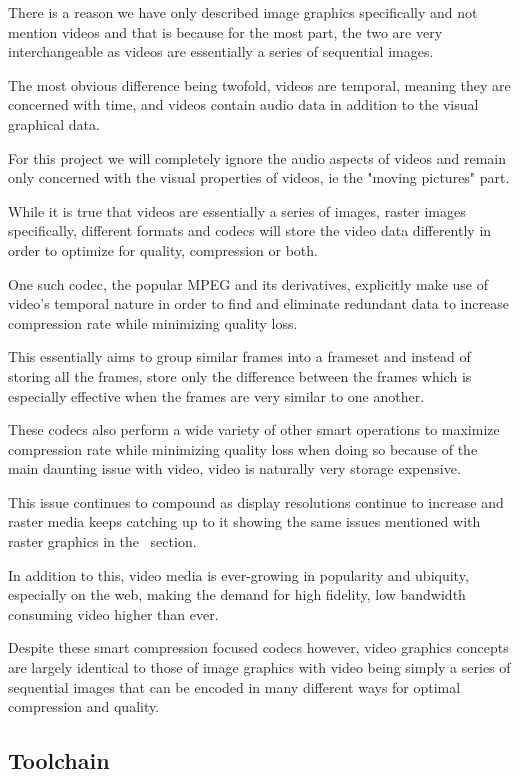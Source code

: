 \documentclass[12pt]{article}
\newcommand{\sentence}{} %
\begin{document}
    \tab
    There is a reason we have only described image graphics specifically and not mention videos and
    that is because for the most part, the two are very interchangeable as videos are essentially a series of
    sequential images.
    \sentence
    The most obvious difference being twofold, videos are temporal, meaning they are concerned with time, and videos
    contain audio data in addition to the visual graphical data.
    \sentence
    For this project we will completely ignore the audio aspects of videos and remain only concerned with the visual
    properties of videos, ie the "moving pictures" part.
    \sentence
    While it is true that videos are essentially a series of images, raster images specifically, different formats
    and codecs will store the video data differently in order to optimize for quality, compression or both.
    \sentence
    One such codec, the popular MPEG and its derivatives, explicitly make use of video's temporal nature in order to
    find and eliminate redundant data to increase compression rate while minimizing quality loss.
    \sentence
    This essentially aims to group similar frames into a frameset and instead of storing all the frames, store only
    the difference between the frames which is especially effective when the frames are very similar to one another.
    \sentence
    These codecs also perform a wide variety of other smart operations to maximize compression rate while minimizing
    quality loss when doing so because of the main daunting issue with video, video is naturally very storage expensive.
    \sentence
    This issue continues to compound as display resolutions continue to increase and raster media keeps catching up
    to it showing the same issues mentioned with raster graphics in the~ section.
    \sentence
    In addition to this, video media is ever-growing in popularity and ubiquity, especially on the web, making the
    demand for high fidelity, low bandwidth consuming video higher than ever.
    \sentence
    Despite these smart compression focused codecs however, video graphics concepts are largely identical to those of
    image graphics with video being simply a series of sequential images that can be encoded in many different ways
    for optimal compression and quality.

    \subsection{Toolchain}\label{subsec:toolchain}
\end{document}
